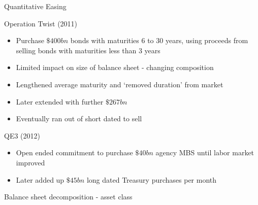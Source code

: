 
	
\begin{frame}{Quantitative Easing}

Operation Twist (2011)
	\begin{itemize}
	\item	Purchase $\$400bn$ bonds with maturities $6$ to $30$ years, using proceeds from selling bonds with maturities less than $3$ years
	\item	Limited impact on size of balance sheet - changing composition
	\item	Lengthened average maturity and `removed duration' from market
	\item	Later extended with further $\$267bn$
	\item	Eventually ran out of short dated to sell
	\end{itemize}
\vspace{2mm}
QE3 (2012)
	\begin{itemize}
	\item	Open ended commitment to purchase $\$40bn$ agency MBS until labor market improved
	\item	Later added up $\$45bn$ long dated Treasury purchases per month
	\end{itemize}

\end{frame}


	
\begin{frame}{Balance sheet decomposition - asset class}

\begin{figure}
\begin{center}


\end{center}
\end{figure}

\end{frame}

